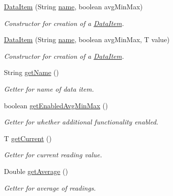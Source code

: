 \begin{DoxyCompactItemize}
\item 
\hyperlink{classcom_1_1jack_1_1motorbikestatistics_1_1_data_item_ae7367bc22bb0d8dc831944c7ce4f39f9}{Data\+Item} (String \hyperlink{classcom_1_1jack_1_1motorbikestatistics_1_1_data_item_a09f8b80430dc1620acbe3532d900fc5a}{name}, boolean avg\+Min\+Max)
\begin{DoxyCompactList}\small\item\em Constructor for creation of a \hyperlink{classcom_1_1jack_1_1motorbikestatistics_1_1_data_item}{Data\+Item}. \end{DoxyCompactList}\item 
\hyperlink{classcom_1_1jack_1_1motorbikestatistics_1_1_data_item_a5bb494fbf02f8157b859694d3c2671d6}{Data\+Item} (String \hyperlink{classcom_1_1jack_1_1motorbikestatistics_1_1_data_item_a09f8b80430dc1620acbe3532d900fc5a}{name}, boolean avg\+Min\+Max, T value)
\begin{DoxyCompactList}\small\item\em Constructor for creation of a \hyperlink{classcom_1_1jack_1_1motorbikestatistics_1_1_data_item}{Data\+Item}. \end{DoxyCompactList}\item 
String \hyperlink{classcom_1_1jack_1_1motorbikestatistics_1_1_data_item_ae0beb1548c3ca85be62eb2e94e9def65}{get\+Name} ()
\begin{DoxyCompactList}\small\item\em Getter for name of data item. \end{DoxyCompactList}\item 
boolean \hyperlink{classcom_1_1jack_1_1motorbikestatistics_1_1_data_item_af9fd13d6997dbf73dfacaaa33f6f3d9e}{get\+Enabled\+Avg\+Min\+Max} ()
\begin{DoxyCompactList}\small\item\em Getter for whether additional functionality enabled. \end{DoxyCompactList}\item 
T \hyperlink{classcom_1_1jack_1_1motorbikestatistics_1_1_data_item_aad19eefe19453103b36ceabca8b1154c}{get\+Current} ()
\begin{DoxyCompactList}\small\item\em Getter for current reading value. \end{DoxyCompactList}\item 
Double \hyperlink{classcom_1_1jack_1_1motorbikestatistics_1_1_data_item_af8e5083ad7651708f7def6b488e881d2}{get\+Average} ()
\begin{DoxyCompactList}\small\item\em Getter for average of readings. \end{DoxyCompactList}\item 

\end{DoxyCompactItemize}
